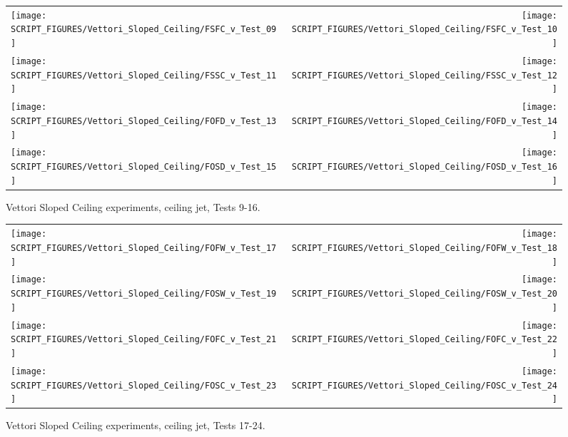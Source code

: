 \begin{figure}[p]
\begin{tabular*}{\textwidth}{l@{\extracolsep{\fill}}r}
\texttt{[image: SCRIPT\_FIGURES/Vettori\_Sloped\_Ceiling/FSFC\_v\_Test\_09]} &
\texttt{[image: SCRIPT\_FIGURES/Vettori\_Sloped\_Ceiling/FSFC\_v\_Test\_10]} \\
\texttt{[image: SCRIPT\_FIGURES/Vettori\_Sloped\_Ceiling/FSSC\_v\_Test\_11]} &
\texttt{[image: SCRIPT\_FIGURES/Vettori\_Sloped\_Ceiling/FSSC\_v\_Test\_12]} \\
\texttt{[image: SCRIPT\_FIGURES/Vettori\_Sloped\_Ceiling/FOFD\_v\_Test\_13]} &
\texttt{[image: SCRIPT\_FIGURES/Vettori\_Sloped\_Ceiling/FOFD\_v\_Test\_14]} \\
\texttt{[image: SCRIPT\_FIGURES/Vettori\_Sloped\_Ceiling/FOSD\_v\_Test\_15]} &
\texttt{[image: SCRIPT\_FIGURES/Vettori\_Sloped\_Ceiling/FOSD\_v\_Test\_16]} \\
\end{tabular*}
\caption{Vettori Sloped Ceiling experiments, ceiling jet, Tests 9-16.}
\label{Vettori_Sloped_2}
\end{figure}

\begin{figure}[p]
\begin{tabular*}{\textwidth}{l@{\extracolsep{\fill}}r}
\texttt{[image: SCRIPT\_FIGURES/Vettori\_Sloped\_Ceiling/FOFW\_v\_Test\_17]} &
\texttt{[image: SCRIPT\_FIGURES/Vettori\_Sloped\_Ceiling/FOFW\_v\_Test\_18]} \\
\texttt{[image: SCRIPT\_FIGURES/Vettori\_Sloped\_Ceiling/FOSW\_v\_Test\_19]} &
\texttt{[image: SCRIPT\_FIGURES/Vettori\_Sloped\_Ceiling/FOSW\_v\_Test\_20]} \\
\texttt{[image: SCRIPT\_FIGURES/Vettori\_Sloped\_Ceiling/FOFC\_v\_Test\_21]} &
\texttt{[image: SCRIPT\_FIGURES/Vettori\_Sloped\_Ceiling/FOFC\_v\_Test\_22]} \\
\texttt{[image: SCRIPT\_FIGURES/Vettori\_Sloped\_Ceiling/FOSC\_v\_Test\_23]} &
\texttt{[image: SCRIPT\_FIGURES/Vettori\_Sloped\_Ceiling/FOSC\_v\_Test\_24]} \\
\end{tabular*}
\caption{Vettori Sloped Ceiling experiments, ceiling jet, Tests 17-24.}
\label{Vettori_Sloped_3}
\end{figure}

